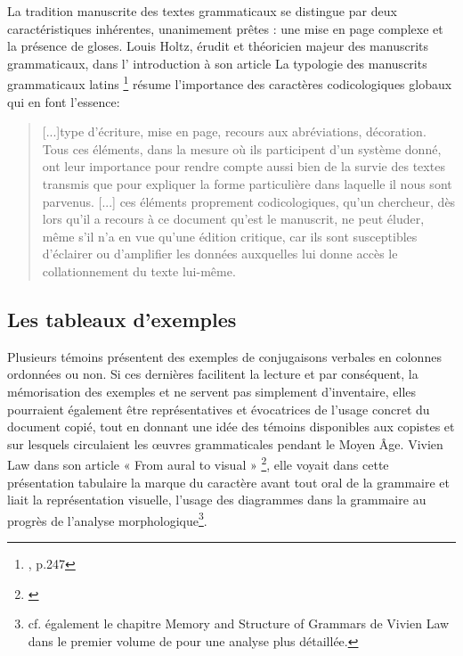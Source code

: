 \documentclass[a4paper, twoside, 12pt]{book}
\begin{document}
La tradition manuscrite des textes grammaticaux se distingue par deux caractéristiques inhérentes, unanimement prêtes : une mise en page complexe et la présence de gloses. Louis Holtz, érudit et théoricien majeur des manuscrits grammaticaux, dans l' introduction à son article \og{} La typologie des manuscrits grammaticaux latins \fg{} \footnote{\cite{holtz1978typologie}, p.247} résume l'importance des caractères codicologiques globaux qui en font l'essence:

\blockquote{[...]type d'écriture, mise en page, recours aux abréviations, décoration. Tous ces éléments, dans la mesure où ils participent d'un système donné, ont leur importance pour rendre compte aussi bien de la survie des textes transmis que pour expliquer la forme particulière dans laquelle il nous sont parvenus. [...] ces éléments proprement codicologiques, qu'un chercheur, dès lors qu'il a recours à ce document qu'est le manuscrit, ne peut éluder, même s'il n'a en vue qu'une édition critique, car ils sont susceptibles d'éclairer ou d'amplifier les données auxquelles lui donne accès le collationnement du texte lui-même.} 

\subsection{Les tableaux d'exemples}

Plusieurs témoins présentent des exemples de conjugaisons verbales en colonnes ordonnées ou non. Si ces dernières facilitent la lecture et par conséquent, la mémorisation des exemples et ne servent pas simplement d’inventaire, elles pourraient également être représentatives et évocatrices de l’usage concret du document copié, tout en donnant une idée des témoins disponibles aux copistes et sur lesquels circulaient les œuvres grammaticales pendant le Moyen Âge. Vivien Law dans son article « From aural to visual » \footnote{\cite{law1997aural}}, elle voyait dans cette \og{} présentation tabulaire\fg{} la marque du caractère avant tout oral de la grammaire et liait la représentation visuelle, l’usage des diagrammes dans la grammaire au progrès de l’analyse morphologique\footnote{cf. également le chapitre \og{}Memory and Structure of Grammars\fg{} de Vivien Law dans le premier volume de \cite{denonnomanuscripts} pour une analyse plus détaillée.}.\\
\end{document}
